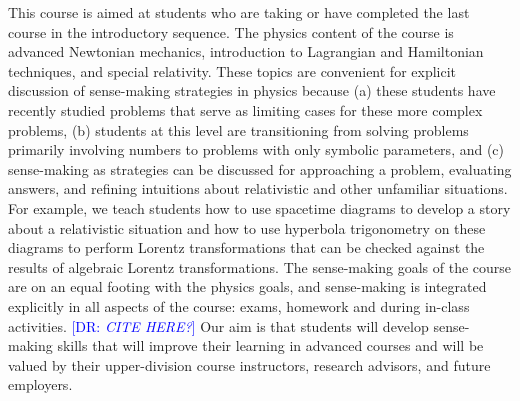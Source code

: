 \documentclass[english,aps,pra,reprint,noshowpacs,superscriptaddress]{revtex4-1}
\newcommand\davidsays[1]{\textcolor{blue}{[\sc DR: {\em#1}]}}
\begin{document}
This course is aimed at students who are taking
or have completed the last course in the introductory sequence. The
physics content of the course is advanced Newtonian mechanics,
introduction to Lagrangian and Hamiltonian techniques, and special
relativity. These topics are convenient
for explicit discussion of sense-making strategies in physics because
(a) these students have recently studied problems that serve as limiting
cases for these more complex problems, (b) students at this level are
transitioning from solving problems primarily involving numbers to
problems with only symbolic parameters, and (c) sense-making as strategies 
can be discussed for approaching a problem, evaluating
answers, and refining intuitions about relativistic and other
unfamiliar situations. For example, we teach students how to use
spacetime diagrams to develop a story about a relativistic situation
and how to use hyperbola trigonometry on these diagrams to perform Lorentz
transformations that can be checked against the results of algebraic
Lorentz transformations.  The sense-making goals of the course are on
an equal footing with the physics goals, and sense-making is integrated
explicitly in all aspects of the course: exams, homework and during
in-class activities. \davidsays{CITE HERE?} Our aim is that students will develop
sense-making skills that will improve their learning in advanced
courses and will be valued by their upper-division course instructors,
research advisors, and future employers.

\end{document}

